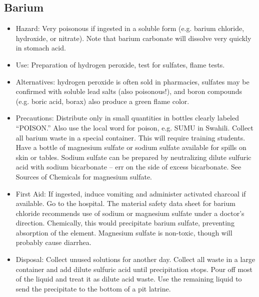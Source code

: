 \subsection{Barium}
\begin{itemize}
\item{Hazard: Very poisonous if ingested in a soluble form 
(e.g. barium chloride, hydroxide, or nitrate). 
Note that barium carbonate will dissolve very quickly in stomach acid.}
\item{Use: Preparation of hydrogen peroxide, 
test for sulfates, flame tests.}
\item{Alternatives: hydrogen peroxide is often sold in pharmacies, 
sulfates may be confirmed with soluble lead salts (also poisonous!), 
and boron compounds (e.g. boric acid, borax) 
also produce a green flame color.} 
\item{Precautions: Distribute only in small quantities 
in bottles clearly labeled “POISON.” 
Also use the local word for poison, e.g. SUMU in Swahili. 
Collect all barium waste in a special container. 
This will require training students. 
Have a bottle of magnesium sulfate 
or sodium sulfate available for spills on skin or tables. 
Sodium sulfate can be prepared by neutralizing dilute sulfuric acid 
with sodium bicarbonate – err on the side of excess bicarbonate. 
See Sources of Chemicals for magnesium sulfate.}
\item{First Aid: If ingested, induce vomiting 
and administer activated charcoal if available. 
Go to the hospital. 
The material safety data sheet for barium chloride 
recommends use of sodium or magnesium sulfate under a doctor's direction. 
Chemically, this would precipitate barium sulfate, 
preventing absorption of the element. 
Magnesium sulfate is non-toxic, though will probably cause diarrhea.}
\item{Disposal: Collect unused solutions for another day. 
Collect all waste in a large container 
and add dilute sulfuric acid until precipitation stops. 
Pour off most of the liquid and treat it as dilute acid waste. 
Use the remaining liquid to send the precipitate 
to the bottom of a pit latrine.}
\end{itemize}

